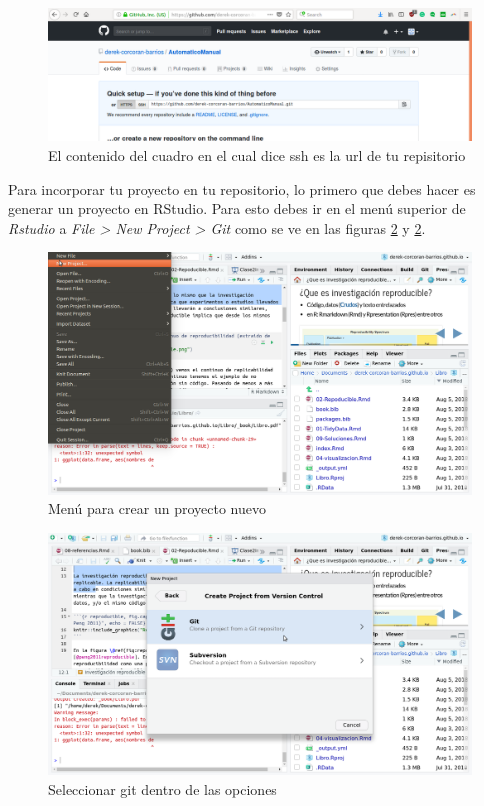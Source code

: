 \documentclass[]{book}
\begin{document}
\begin{figure}

{\centering \includegraphics[width=0.8\linewidth]{GitAdress} 

}

\caption{El contenido del cuadro en el cual dice ssh es la url de tu repisitorio}\label{fig:ssh}
\end{figure}

Para incorporar tu proyecto en tu repositorio, lo primero que debes
hacer es generar un proyecto en RStudio. Para esto debes ir en el menú
superior de \emph{Rstudio} a \emph{File \textgreater{} New Project
\textgreater{} Git} como se ve en las figuras \ref{fig:NewProject} y
\ref{fig:NewProject}.

\begin{figure}

{\centering \includegraphics[width=0.8\linewidth]{NewProject} 

}

\caption{Menú para crear un proyecto nuevo}\label{fig:NewProject}
\end{figure}

\begin{figure}

{\centering \includegraphics[width=0.8\linewidth]{Git} 

}

\caption{Seleccionar git dentro de las opciones}\label{fig:Git}
\end{figure}
\end{document}
